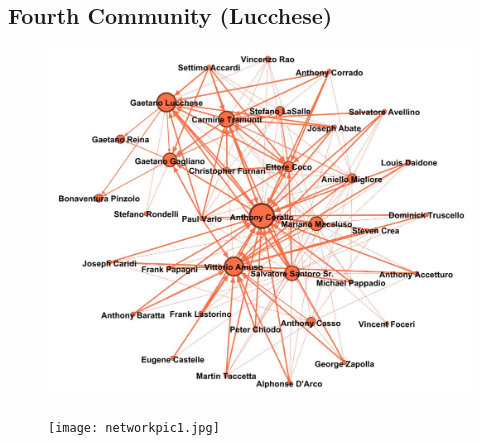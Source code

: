 \documentclass{article}
\begin{document}
\textcolor{Titoli}{\subsection{Fourth Community (Lucchese)}}
\begin{figure}[h!]
\vspace{35pt}
\centering
\includegraphics[width=550pt]{lucchesemodule.JPG}
\advance\leftskip-2.5cm
\end{figure}
\newpage



\begin{figure}[t!]
\vspace{-250pt}
\centering
\texttt{[image: networkpic1.jpg]}
\advance\leftskip-3.52cm
\end{figure}
\end{document}
